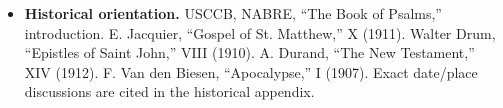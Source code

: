 \begin{itemize}[leftmargin=1.3em,itemsep=.4em]
\item \textbf{Historical orientation.} USCCB, NABRE, ``The Book of Psalms,'' introduction. E. Jacquier, ``Gospel of St. Matthew,''  X (1911). Walter Drum, ``Epistles of Saint John,'' VIII (1910). A. Durand, ``The New Testament,'' XIV (1912). F. Van den Biesen, ``Apocalypse,'' I (1907). Exact date/place discussions are cited in the historical appendix.
\end{itemize}
